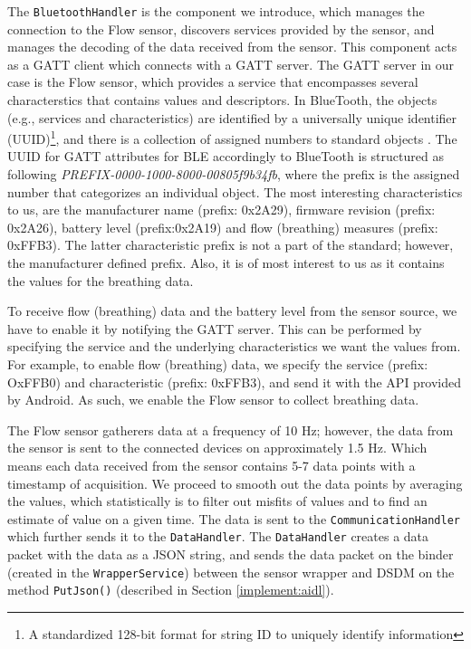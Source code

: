 The \verb|BluetoothHandler| is the component we introduce, which manages the connection to the Flow sensor, discovers services provided by the sensor, and manages the decoding of the data received from the sensor. This component acts as a GATT client which connects with a GATT server. The GATT server in our case is the Flow sensor, which provides a service that encompasses several characterstics that contains values and descriptors. In BlueTooth, the objects (e.g., services and characteristics) are identified by a universally unique identifier (UUID)\footnote{A standardized 128-bit format for string ID to uniquely identify information}, and there is a collection of assigned numbers to standard objects \cite{uuid}. The UUID for GATT attributes for BLE accordingly to BlueTooth is structured as following \textit{PREFIX-0000-1000-8000-00805f9b34fb}, where the prefix is the assigned number that categorizes an individual object. The most interesting characteristics to us, are the manufacturer name (prefix: 0x2A29), firmware revision (prefix: 0x2A26), battery level (prefix:0x2A19) and flow (breathing) measures (prefix: 0xFFB3). The latter characteristic prefix is not a part of the standard; however, the manufacturer defined prefix. Also, it is of most interest to us as it contains the values for the breathing data. 

To receive flow (breathing) data and the battery level from the sensor source, we have to enable it by notifying the GATT server. This can be performed by specifying the service and the underlying characteristics we want the values from. For example, to enable flow (breathing) data, we specify the service (prefix: OxFFB0) and characteristic (prefix: 0xFFB3), and send it with the API provided by Android.  As such, we enable the Flow sensor to collect breathing data. 

The Flow sensor gatherers data at a frequency of 10 Hz; however, the data from the sensor is sent to the connected devices on approximately 1.5 Hz. Which means each data received from the sensor contains 5-7 data points with a timestamp of acquisition. We proceed to smooth out the data points by averaging the values, which statistically is to filter out misfits of values and to find an estimate of value on a given time. The data is sent to the \verb|CommunicationHandler| which further sends it to the \verb|DataHandler|. The \verb|DataHandler| creates a data packet with the data as a JSON string, and sends the data packet on the binder (created in the \verb|WrapperService|) between the sensor wrapper and DSDM on the method \verb|PutJson()| (described in Section \ref{implement:aidl}). 

